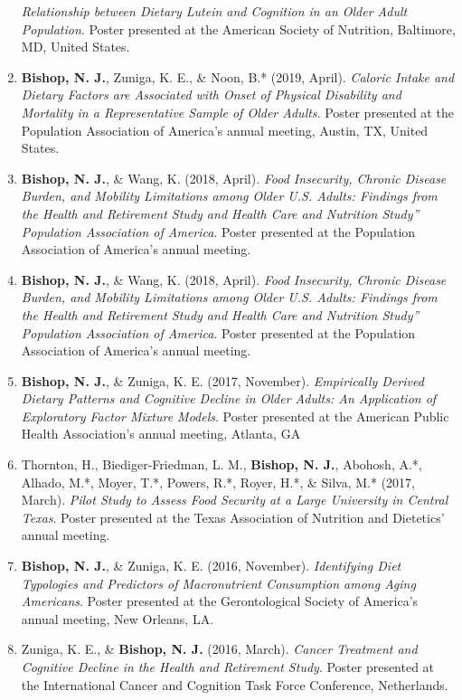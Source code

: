 \documentclass[
]{article}
\begin{document}
\begin{enumerate}
  \emph{Relationship between Dietary Lutein and Cognition in an Older
  Adult Population}. Poster presented at the American Society of
  Nutrition, Baltimore, MD, United States.
\item
  \textbf{Bishop, N. J.}, Zuniga, K. E., \& Noon, B.* (2019, April).
  \emph{Caloric Intake and Dietary Factors are Associated with Onset of
  Physical Disability and Mortality in a Representative Sample of Older
  Adults}. Poster presented at the Population Association of America's
  annual meeting, Austin, TX, United States.
\item
  \textbf{Bishop, N. J.}, \& Wang, K. (2018, April). \emph{Food
  Insecurity, Chronic Disease Burden, and Mobility Limitations among
  Older U.S. Adults: Findings from the Health and Retirement Study and
  Health Care and Nutrition Study'' Population Association of America}.
  Poster presented at the Population Association of America's annual
  meeting.
\item
  \textbf{Bishop, N. J.}, \& Wang, K. (2018, April). \emph{Food
  Insecurity, Chronic Disease Burden, and Mobility Limitations among
  Older U.S. Adults: Findings from the Health and Retirement Study and
  Health Care and Nutrition Study'' Population Association of America}.
  Poster presented at the Population Association of America's annual
  meeting.
\item
  \textbf{Bishop, N. J.}, \& Zuniga, K. E. (2017, November).
  \emph{Empirically Derived Dietary Patterns and Cognitive Decline in
  Older Adults: An Application of Exploratory Factor Mixture Models}.
  Poster presented at the American Public Health Association's annual
  meeting, Atlanta, GA
\item
  Thornton, H., Biediger-Friedman, L. M., \textbf{Bishop, N. J.},
  Abohosh, A.*, Alhado, M.*, Moyer, T.*, Powers, R.*, Royer, H.*, \&
  Silva, M.* (2017, March). \emph{Pilot Study to Assess Food Security at
  a Large University in Central Texas}. Poster presented at the Texas
  Association of Nutrition and Dietetics' annual meeting.
\item
  \textbf{Bishop, N. J.}, \& Zuniga, K. E. (2016, November).
  \emph{Identifying Diet Typologies and Predictors of Macronutrient
  Consumption among Aging Americans}. Poster presented at the
  Gerontological Society of America's annual meeting, New Orleans, LA.
\item
  Zuniga, K. E., \& \textbf{Bishop, N. J.} (2016, March). \emph{Cancer
  Treatment and Cognitive Decline in the Health and Retirement Study}.
  Poster presented at the International Cancer and Cognition Task Force
  Conference, Netherlands.
\end{enumerate}
\end{document}
